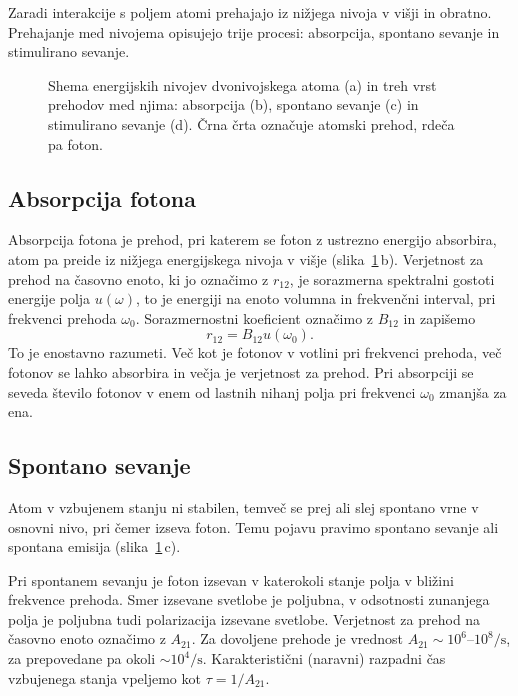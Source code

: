 Zaradi interakcije s poljem
atomi prehajajo iz nižjega nivoja v višji in obratno. Prehajanje 
med nivojema opisujejo trije procesi: 
absorpcija, spontano sevanje in stimulirano sevanje.

\begin{figure}[h]
\centering
\def\svgwidth{145truemm} 

\caption{Shema energijskih nivojev dvonivojskega atoma (a) in treh vrst prehodov med njima:
absorpcija (b), spontano sevanje (c) in stimulirano sevanje (d). Črna črta označuje atomski
prehod, rdeča pa foton.}
\label{sl4.1}
\end{figure}

\subsection*{Absorpcija fotona}
Absorpcija fotona je prehod, pri katerem se foton 
z ustrezno energijo absorbira, atom pa preide iz nižjega energijskega nivoja 
v višje (slika~\ref{sl4.1}\,b). 
Verjetnost za prehod na časovno enoto, ki jo označimo z $r_{12}$, 
je sorazmerna spektralni gostoti energije polja $u(\omega)$, 
to je energiji na enoto volumna in frekvenčni interval, pri frekvenci prehoda $\omega_{0}$.
Sorazmernostni koeficient označimo z $B_{12}$ in 
zapišemo
\begin{equation}
r_{12}=B_{12}u(\omega_{0}).
\label{4.16}
\end{equation}
To je enostavno razumeti. Več kot je fotonov v votlini pri frekvenci prehoda, 
več fotonov se lahko absorbira in večja je verjetnost za prehod. Pri absorpciji se
seveda število fotonov v enem od lastnih nihanj polja pri frekvenci
$\omega_{0}$ zmanjša za ena.

\subsection*{Spontano sevanje}
Atom v vzbujenem stanju ni stabilen, temveč se prej ali slej spontano vrne 
v osnovni nivo, pri čemer izseva foton. Temu pojavu pravimo spontano sevanje 
ali spontana emisija (slika~\ref{sl4.1}\,c).

Pri spontanem sevanju je foton izsevan v katerokoli stanje polja v bližini 
frekvence prehoda. Smer izsevane svetlobe je poljubna, v odsotnosti zunanjega polja
je poljubna tudi polarizacija izsevane svetlobe.
Verjetnost za prehod na časovno enoto označimo z $A_{21}$.
Za dovoljene prehode je vrednost $A_{21} \sim 10^6$--$10^8/\si{\second}$, 
za prepovedane pa okoli $\sim 10^4/\si{\second}$. Karakteristični (naravni) 
razpadni čas vzbujenega stanja vpeljemo kot
$\tau = 1/A_{21}$. 

